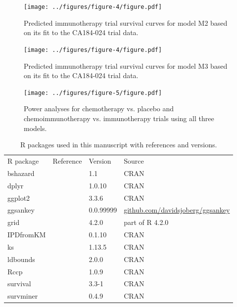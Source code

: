 \documentclass[a4paper,10pt]{article}
\begin{document}


\begin{figure}[h]

\texttt{[image: ../figures/figure-4/figure.pdf]}

\caption{Predicted immunotherapy trial survival curves for model M2 based on its
fit to the CA184-024 trial data.}
\label{fig:pred_m2}
\end{figure}



\begin{figure}[h]

\texttt{[image: ../figures/figure-4/figure.pdf]}

\caption{Predicted immunotherapy trial survival curves for model M3 based on its
fit to the CA184-024 trial data.}
\label{fig:pred_m3}
\end{figure}


\begin{figure}[h]

\texttt{[image: ../figures/figure-5/figure.pdf]}

\caption{Power analyses for chemotherapy vs. placebo and chemoimmunotherapy vs. 
immunotherapy trials using all three models.}
\label{fig:pwr_m2_m3}
\end{figure}


\clearpage

\begin{table}
\begin{tabular}{llll}
R package & Reference & Version & Source \\
bshazard & \cite{Rbshazard} & 1.1 & CRAN \\
dplyr &  \cite{Rdplyr} & 1.0.10 & CRAN \\
ggplot2 &  \cite{Rggplot2} & 3.3.6 & CRAN \\
ggsankey & \cite{Rggsankey} &  0.0.99999 & 
	\href{https://github.com/davidsjoberg/ggsankey}{github.com/davidsjoberg/ggsankey} \\
grid & \cite{Rlang} & 4.2.0 & part of R 4.2.0  \\
IPDfromKM & \cite{Ripdfromkm} & 0.1.10 & CRAN  \\ 
ks & \cite{Rks} & 1.13.5 & CRAN \\
ldbounds & \cite{Rldbounds} & 2.0.0 & CRAN  \\
Rccp & \cite{Eddelbuettel2011} & 1.0.9 & CRAN  \\ 
survival & \cite{Rsurvivalbook} & 3.3-1 & CRAN  \\
survminer & \cite{Rsurvminer} & 0.4.9 & CRAN  \\
\end{tabular}
\caption{R packages used in this manuscript with references and versions.}
\label{tab:rpackages}
\end{table}
\end{document}
